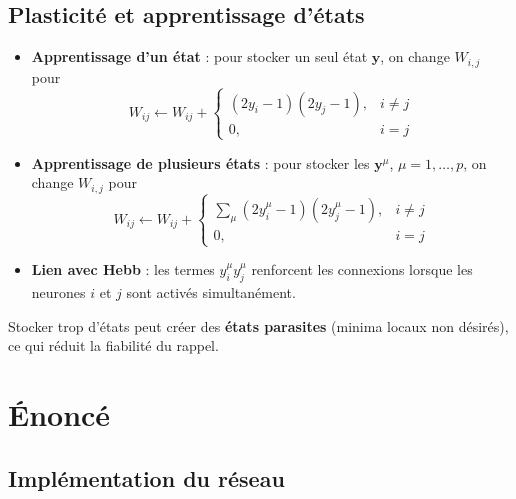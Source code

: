\documentclass[12pt, letterpaper]{article}
\begin{document}
\subsection{Plasticité et apprentissage d’états}

\begin{itemize}
	\item \textbf{Apprentissage d'un état} : pour stocker un seul état $\mathbf{y}$, on change $W_{i,j}$ pour
	      \[
		      W_{ij} \leftarrow W_{ij} +
		      \begin{cases}
			      (2y_i-1)(2y_j-1), & i \neq j \\
			      0,                & i=j
		      \end{cases}
	      \]
	\item \textbf{Apprentissage de plusieurs états} : pour stocker les $\mathbf{y}^\mu$, $\mu=1,\ldots, p$,  on change $W_{i,j}$ pour
	      \[
		      W_{ij} \leftarrow W_{ij} +
		      \begin{cases}
			      \sum_\mu (2y_i^\mu-1)(2y_j^\mu-1), & i \neq j \\
			      0,                                 & i=j
		      \end{cases}
	      \]
	\item \textbf{Lien avec Hebb} : les termes $y_i^\mu y_j^\mu$ renforcent les connexions lorsque les neurones $i$ et $j$ sont activés simultanément.
\end{itemize}

\begin{tcolorbox}[title=Remarque]
	Stocker trop d’états peut créer des \textbf{états parasites} (minima locaux non désirés), ce qui réduit la fiabilité du rappel.
\end{tcolorbox}

\section{Énoncé}\label{sec:enonce}

\subsection{Implémentation du réseau}\label{subsec:modele}
\end{document}
